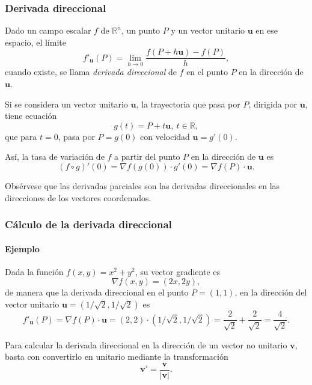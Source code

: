 \begin{frame}
	\frametitle{Derivada direccional}
	\begin{definicion}
		Dado un campo escalar $f$ de $\mathbb{R}^n$, un punto $P$ y un vector unitario $\mathbf{u}$ en ese espacio, el límite
		\[
			f'_{\mathbf{u}}(P) = \lim_{h\rightarrow 0}\frac{f(P+h\mathbf{u})-f(P)}{h},
		\] 
		cuando existe, se llama \emph{derivada direccional} de $f$ en el punto $P$ en la dirección de $\mathbf{u}$.
	\end{definicion}
	Si se considera un vector unitario $\mathbf{u}$, la trayectoria que pasa por $P$, dirigida por $\mathbf{u}$, tiene ecuación
	\[
		g(t)=P+t\mathbf{u},\ t\in\mathbb{R},
	\]
	que para $t=0$, pasa por $P=g(0)$ con velocidad $\mathbf{u}=g'(0)$.
	
	Así, la tasa de variación de $f$ a partir del punto $P$ en la dirección de $\mathbf{u}$ es
	\[
		(f\circ g)'(0) = \nabla f(g(0))\cdot g'(0) = \nabla f(P)\cdot \mathbf{u}.
	\]
	
	Obsérvese que las derivadas parciales son las derivadas direccionales en las direcciones de los vectores coordenados. 
\end{frame}


\begin{frame}
	\frametitle{Cálculo de la derivada direccional}
	\framesubtitle{Ejemplo}
	Dada la función $f(x,y) = x^2+y^2$, su vector gradiente es
	\[
		\nabla f(x,y) = (2x,2y),
	\]
	de manera que la derivada direccional en el punto $P=(1,1)$, en la dirección del vector unitario $\mathbf{u}=(1/\sqrt{2},1/\sqrt{2})$ es
	\[
		f'_{\mathbf{u}}(P) = \nabla f(P)\cdot \mathbf{u} = (2,2)\cdot(1/\sqrt{2},1/\sqrt{2}) = \frac{2}{\sqrt{2}}+\frac{2}{\sqrt{2}} = \frac{4}{\sqrt{2}}.
	\]
	
	Para calcular la derivada direccional en la dirección de un vector no unitario $\mathbf{v}$, basta con convertirlo en unitario mediante la transformación
	\[
		\mathbf{v'}=\frac{\mathbf{v}}{|\mathbf{v}|}.
	\] 
\end{frame}


